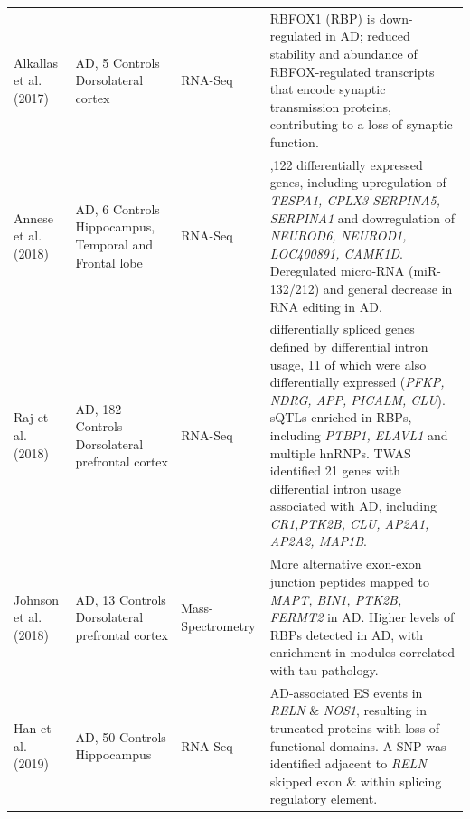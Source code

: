 \begin{landscape}
\begin{longtable}[c]{p{3cm}p{4cm}p{3cm}p{16cm}}
		\centering Alkallas et al. (2017)\cite{Alkallas2017} &
		\centering 6 AD, 5 Controls \newline Dorsolateral cortex &
		\centering RNA-Seq &
		\tabitem RBFOX1 (RBP) is down-regulated in AD; reduced stability and abundance of RBFOX-regulated transcripts that encode synaptic transmission proteins, contributing to a loss of synaptic function.	\\
		\hdashline[0.5pt/5pt]
		
		\centering Annese et al. (2018)\cite{Annese2018} &
		\centering 6 AD, 6 Controls \newline Hippocampus, Temporal and Frontal lobe &
		\centering RNA-Seq &
		\tabitem 2,122 differentially expressed genes, including upregulation of \textit{TESPA1, CPLX3 SERPINA5, SERPINA1} and dowregulation of \textit{NEUROD6, NEUROD1, LOC400891, CAMK1D}. \newline
		\tabitem Deregulated micro-RNA (miR-132/212) and general decrease in RNA editing in AD. \\
		\hdashline[0.5pt/5pt]
		
		\centering Raj et al. \newline (2018)\cite{Raj2018} &
		\centering 268 AD, 182 Controls \newline Dorsolateral prefrontal cortex &
		\centering RNA-Seq &
		\tabitem 84 differentially spliced genes defined by differential intron usage, 11 of which were also differentially expressed (\textit{PFKP, NDRG, APP, PICALM, CLU}). \newline
		\tabitem sQTLs enriched in RBPs, including \textit{PTBP1, ELAVL1} and multiple hnRNPs. \newline
		\tabitem TWAS identified 21 genes with differential intron usage associated with AD, including \textit{CR1,PTK2B, CLU, AP2A1, AP2A2, MAP1B}. \\
		\hdashline[0.5pt/5pt]
		
		\centering Johnson et al. \newline (2018)\cite{Johnson2018} &
		\centering 20 AD, 13 Controls \newline Dorsolateral prefrontal cortex &
		\centering Mass-Spectrometry &
		\tabitem More alternative exon-exon junction peptides mapped to \textit{MAPT, BIN1, PTK2B, FERMT2} in AD. \newline 
		\tabitem Higher levels of RBPs detected in AD, with enrichment in modules correlated with tau pathology. \\
		\hdashline[0.5pt/5pt]	
		
		\centering Han et al. (2019) \cite{Han2019} &
		\centering 24 AD, 50 Controls \newline Hippocampus &
		\centering RNA-Seq &
		\tabitem 3 AD-associated ES events in \textit{RELN} \& \textit{NOS1}, resulting in truncated proteins with loss of functional domains. A SNP was identified adjacent to \textit{RELN} skipped exon \& within splicing regulatory element. \\
		

\end{longtable}
\end{landscape}
